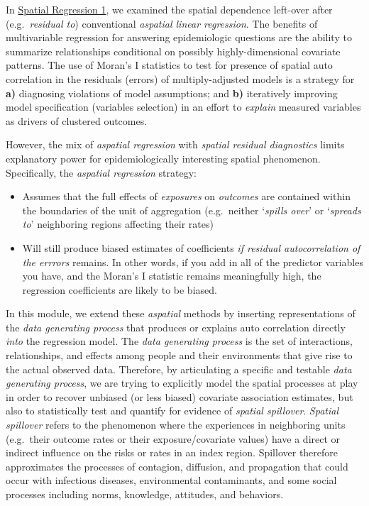 \documentclass[
]{book}
\providecommand{\tightlist}{%
  \setlength{\itemsep}{0pt}\setlength{\parskip}{0pt}}
\begin{document}
In \protect\hyperlink{spatreg1}{Spatial Regression 1}, we examined the spatial dependence left-over after (e.g.~\emph{residual to}) conventional \emph{aspatial linear regression}. The benefits of multivariable regression for answering epidemiologic questions are the ability to summarize relationships conditional on possibly highly-dimensional covariate patterns. The use of Moran's I statistics to test for presence of spatial auto correlation in the residuals (errors) of multiply-adjusted models is a strategy for \textbf{a)} diagnosing violations of model assumptions; and \textbf{b)} iteratively improving model specification (variables selection) in an effort to \emph{explain} measured variables as drivers of clustered outcomes.

However, the mix of \emph{aspatial regression} with \emph{spatial residual diagnostics} limits explanatory power for epidemiologically interesting spatial phenomenon. Specifically, the \emph{aspatial regression} strategy:

\begin{itemize}
\tightlist
\item
  Assumes that the full effects of \emph{exposures} on \emph{outcomes} are contained within the boundaries of the unit of aggregation (e.g.~neither `\emph{spills over}' or `\emph{spreads to}' neighboring regions affecting their rates)
\item
  Will still produce biased estimates of coefficients \emph{if residual autocorrelation of the errrors} remains. In other words, if you add in all of the predictor variables you have, and the Moran's I statistic remains meaningfully high, the regression coefficients are likely to be biased.
\end{itemize}

In this module, we extend these \emph{aspatial} methods by inserting representations of the \emph{data generating process} that produces or explains auto correlation directly \emph{into} the regression model. The \emph{data generating process} is the set of interactions, relationships, and effects among people and their environments that give rise to the actual observed data. Therefore, by articulating a specific and testable \emph{data generating process}, we are trying to explicitly model the spatial processes at play in order to recover unbiased (or less biased) covariate association estimates, but also to statistically test and quantify for evidence of \emph{spatial spillover}. \emph{Spatial spillover} refers to the phenomenon where the experiences in neighboring units (e.g.~their outcome rates or their exposure/covariate values) have a direct or indirect influence on the risks or rates in an index region. Spillover therefore approximates the processes of contagion, diffusion, and propagation that could occur with infectious diseases, environmental contaminants, and some social processes including norms, knowledge, attitudes, and behaviors.
\end{document}
